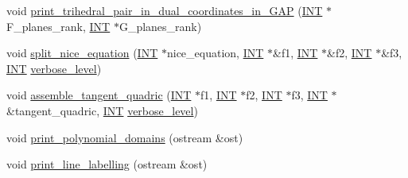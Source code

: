 \begin{DoxyCompactItemize}
\item 
void \mbox{\hyperlink{classsurface_a8cb36b5098a585e239fe65f93b60e961}{print\+\_\+trihedral\+\_\+pair\+\_\+in\+\_\+dual\+\_\+coordinates\+\_\+in\+\_\+\+G\+AP}} (\mbox{\hyperlink{galois_8h_a09fddde158a3a20bd2dcadb609de11dc}{I\+NT}} $\ast$F\+\_\+planes\+\_\+rank, \mbox{\hyperlink{galois_8h_a09fddde158a3a20bd2dcadb609de11dc}{I\+NT}} $\ast$G\+\_\+planes\+\_\+rank)
\item 
void \mbox{\hyperlink{classsurface_a5d670fff3513ca4261aeb0fe95b6771c}{split\+\_\+nice\+\_\+equation}} (\mbox{\hyperlink{galois_8h_a09fddde158a3a20bd2dcadb609de11dc}{I\+NT}} $\ast$nice\+\_\+equation, \mbox{\hyperlink{galois_8h_a09fddde158a3a20bd2dcadb609de11dc}{I\+NT}} $\ast$\&f1, \mbox{\hyperlink{galois_8h_a09fddde158a3a20bd2dcadb609de11dc}{I\+NT}} $\ast$\&f2, \mbox{\hyperlink{galois_8h_a09fddde158a3a20bd2dcadb609de11dc}{I\+NT}} $\ast$\&f3, \mbox{\hyperlink{galois_8h_a09fddde158a3a20bd2dcadb609de11dc}{I\+NT}} \mbox{\hyperlink{simeon_8_c_a818073fbcc2f439e7c56952f67386122}{verbose\+\_\+level}})
\item 
void \mbox{\hyperlink{classsurface_ae14b94847bf8bd92bc6af58b31884cdc}{assemble\+\_\+tangent\+\_\+quadric}} (\mbox{\hyperlink{galois_8h_a09fddde158a3a20bd2dcadb609de11dc}{I\+NT}} $\ast$f1, \mbox{\hyperlink{galois_8h_a09fddde158a3a20bd2dcadb609de11dc}{I\+NT}} $\ast$f2, \mbox{\hyperlink{galois_8h_a09fddde158a3a20bd2dcadb609de11dc}{I\+NT}} $\ast$f3, \mbox{\hyperlink{galois_8h_a09fddde158a3a20bd2dcadb609de11dc}{I\+NT}} $\ast$\&tangent\+\_\+quadric, \mbox{\hyperlink{galois_8h_a09fddde158a3a20bd2dcadb609de11dc}{I\+NT}} \mbox{\hyperlink{simeon_8_c_a818073fbcc2f439e7c56952f67386122}{verbose\+\_\+level}})
\item 
void \mbox{\hyperlink{classsurface_a4be62ffec9d7c0445f2a6bebfaa4f585}{print\+\_\+polynomial\+\_\+domains}} (ostream \&ost)
\item 
void \mbox{\hyperlink{classsurface_afeef78615e64039d71631765309d518e}{print\+\_\+line\+\_\+labelling}} (ostream \&ost)
\end{DoxyCompactItemize}
